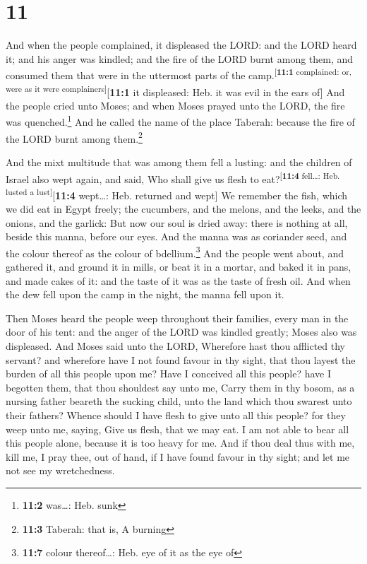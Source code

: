 \hypertarget{section-10}{%
\section{11}\label{section-10}}

 And when the people complained, it displeased the LORD:
and the LORD heard it; and his anger was kindled; and the fire of the
LORD burnt among them, and consumed them that were in the uttermost
parts of the camp.\textsuperscript{{[}\textbf{11:1} complained: or, were
as it were complainers{]}}{[}\textbf{11:1} it displeased: Heb. it was
evil in the ears of{]}  And the people cried unto Moses;
and when Moses prayed unto the LORD, the fire was quenched.\footnote{\textbf{11:2}
  was\ldots: Heb. sunk}  And he called the name of the
place Taberah: because the fire of the LORD burnt among them.\footnote{\textbf{11:3}
  Taberah: that is, A burning}

 And the mixt multitude that was among them fell a
lusting: and the children of Israel also wept again, and said, Who shall
give us flesh to eat?\textsuperscript{{[}\textbf{11:4} fell\ldots: Heb.
lusted a lust{]}}{[}\textbf{11:4} wept\ldots: Heb. returned and wept{]}
 We remember the fish, which we did eat in Egypt freely;
the cucumbers, and the melons, and the leeks, and the onions, and the
garlick:  But now our soul is dried away: there is nothing
at all, beside this manna, before our eyes.  And the manna
was as coriander seed, and the colour thereof as the colour of
bdellium.\footnote{\textbf{11:7} colour thereof\ldots: Heb. eye of it as
  the eye of}  And the people went about, and gathered it,
and ground it in mills, or beat it in a mortar, and baked it in pans,
and made cakes of it: and the taste of it was as the taste of fresh oil.
 And when the dew fell upon the camp in the night, the
manna fell upon it.

 Then Moses heard the people weep throughout their
families, every man in the door of his tent: and the anger of the LORD
was kindled greatly; Moses also was displeased.  And
Moses said unto the LORD, Wherefore hast thou afflicted thy servant? and
wherefore have I not found favour in thy sight, that thou layest the
burden of all this people upon me?  Have I conceived all
this people? have I begotten them, that thou shouldest say unto me,
Carry them in thy bosom, as a nursing father beareth the sucking child,
unto the land which thou swarest unto their fathers? 
Whence should I have flesh to give unto all this people? for they weep
unto me, saying, Give us flesh, that we may eat.  I am
not able to bear all this people alone, because it is too heavy for me.
 And if thou deal thus with me, kill me, I pray thee, out
of hand, if I have found favour in thy sight; and let me not see my
wretchedness.

